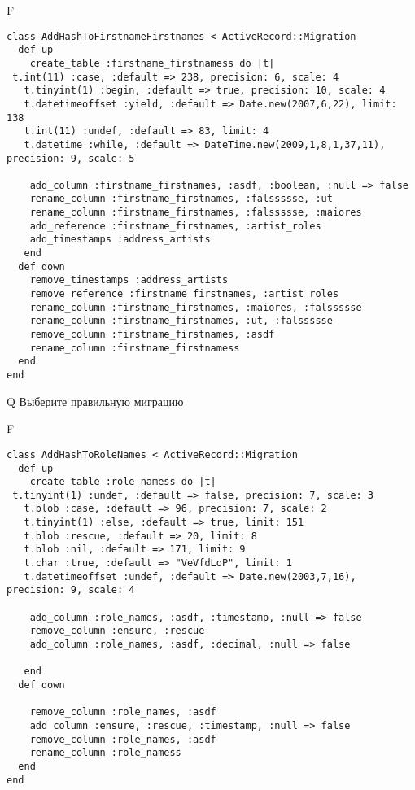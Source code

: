 F
\begin{verbatim}
class AddHashToFirstnameFirstnames < ActiveRecord::Migration
  def up
    create_table :firstname_firstnamess do |t| 
 t.int(11) :case, :default => 238, precision: 6, scale: 4
   t.tinyint(1) :begin, :default => true, precision: 10, scale: 4
   t.datetimeoffset :yield, :default => Date.new(2007,6,22), limit: 138
   t.int(11) :undef, :default => 83, limit: 4
   t.datetime :while, :default => DateTime.new(2009,1,8,1,37,11), precision: 9, scale: 5

    add_column :firstname_firstnames, :asdf, :boolean, :null => false
    rename_column :firstname_firstnames, :falssssse, :ut
    rename_column :firstname_firstnames, :falssssse, :maiores
    add_reference :firstname_firstnames, :artist_roles
    add_timestamps :address_artists
   end
  def down
    remove_timestamps :address_artists
    remove_reference :firstname_firstnames, :artist_roles
    rename_column :firstname_firstnames, :maiores, :falssssse
    rename_column :firstname_firstnames, :ut, :falssssse
    remove_column :firstname_firstnames, :asdf
    rename_column :firstname_firstnamess
  end
end
\end{verbatim}
Q
Выберите правильную миграцию

F
\begin{verbatim}
class AddHashToRoleNames < ActiveRecord::Migration
  def up
    create_table :role_namess do |t| 
 t.tinyint(1) :undef, :default => false, precision: 7, scale: 3
   t.blob :case, :default => 96, precision: 7, scale: 2
   t.tinyint(1) :else, :default => true, limit: 151
   t.blob :rescue, :default => 20, limit: 8
   t.blob :nil, :default => 171, limit: 9
   t.char :true, :default => "VeVfdLoP", limit: 1
   t.datetimeoffset :undef, :default => Date.new(2003,7,16), precision: 9, scale: 4

    add_column :role_names, :asdf, :timestamp, :null => false
    remove_column :ensure, :rescue
    add_column :role_names, :asdf, :decimal, :null => false

   end
  def down

    remove_column :role_names, :asdf
    add_column :ensure, :rescue, :timestamp, :null => false
    remove_column :role_names, :asdf
    rename_column :role_namess
  end
end
\end{verbatim}

